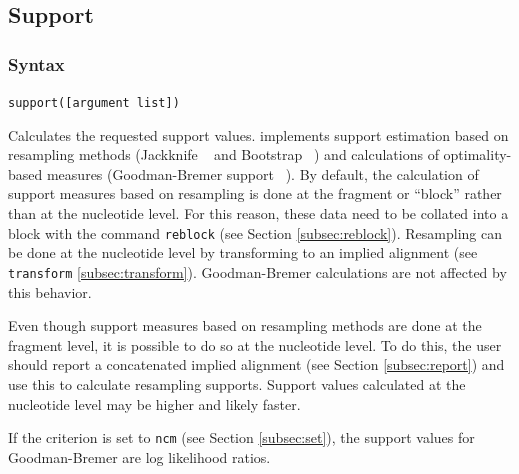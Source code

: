 \subsection{Support}
\label{subsec:support}
	\subsubsection{Syntax}
		\texttt{support([argument list])}
		
	\begin{phygdescription}
		{Calculates the requested support values. \phyg implements support estimation 
		based on resampling methods (Jackknife ~\cite{Farrisetal1996} and Bootstrap
		~\cite{Felsenstein1985}) and calculations of optimality-based measures 
		(Goodman-Bremer support ~\cite{Goodmanetal1982, Bremer1988}). By default, 
		the calculation of support measures based on resampling is done at the fragment 
		or ``block'' rather than at the nucleotide level. For this reason, these data need to 
		be collated into a block with the command \texttt{reblock} (see Section 
		\ref{subsec:reblock}). Resampling can be done at the nucleotide level by 
		transforming to an implied alignment (see \texttt{transform} \ref{subsec:transform}). 
		Goodman-Bremer calculations are not affected by this behavior. 

		\begin{tcolorbox}[enhanced,fit to height=3.0cm,
  		colback=JungleGreen!40!black!2!white,colframe=JungleGreen!70!black,title=Note,
  		drop fuzzy shadow]
  		Even though support measures based on resampling methods are done at the 
		fragment level, it is possible to do so at the nucleotide level. To do this, the user
		should report a concatenated implied alignment (see Section \ref{subsec:report})
		and use this to calculate resampling supports.
		Support values calculated at the nucleotide level may be higher and likely faster.
		
		\end{tcolorbox}

		If the criterion is set to \texttt{ncm} (see Section \ref{subsec:set}), the support values 
		for Goodman-Bremer are log likelihood ratios.}
	\end{phygdescription}
		
